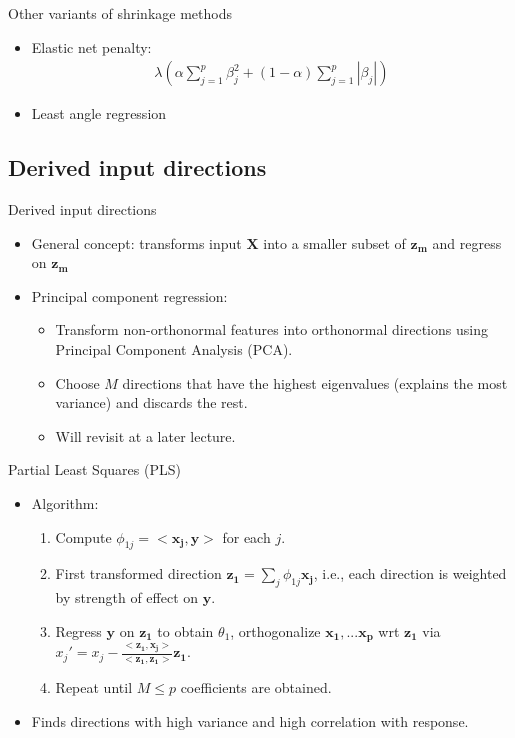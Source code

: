 \documentclass[aspectratio=169]{beamer}
\let \vec \mathbf
\begin{document}
\begin{frame}{Other variants of shrinkage methods}
    \begin{itemize}
        \item Elastic net penalty:
        \begin{eqnarray*}
            \lambda \left( \alpha \sum_{j=1}^p \beta_j^2+ (1-\alpha) \sum_{j=1}^p |\beta_j| \right)
        \end{eqnarray*}
        \item Least angle regression
    \end{itemize}
\end{frame}


\subsection{Derived input directions}

\begin{frame}{Derived input directions}
    \begin{itemize}
        \item General concept: transforms input $\vec{X}$ into a smaller subset of $\vec{z_m}$ and regress on $\vec{z_m}$
        \item Principal component regression:
        \begin{itemize}
            \item Transform non-orthonormal features into orthonormal directions using Principal Component Analysis (PCA).
            \item Choose $M$ directions that have the highest eigenvalues (explains the most variance) and discards the rest.
            \item Will revisit at a later lecture.
        \end{itemize}
    \end{itemize}
\end{frame}


\begin{frame}{Partial Least Squares (PLS)}
    \begin{itemize}
        \item Algorithm:
        \begin{enumerate}
            \item Compute $\phi_{1j} = <\vec{x_j}, \vec{y}>$ for each $j$.
            \item First transformed direction $\vec{z_1} = \sum_j \phi_{1j} \vec{x_j}$, i.e., each direction is weighted by strength of effect on $\vec{y}$.
            \item Regress $\vec{y}$ on $\vec{z_1}$ to obtain $\theta_1$, orthogonalize $\vec{x_1}, ... \vec{x_p}$ wrt $\vec{z_1}$ via $x_j' = x_j - \frac{<\vec{z_1}, \vec{x_j}>}{<\vec{z_1}, \vec{z_1}>}\vec{z_1}$.
            \item Repeat until $M \leq p$ coefficients are obtained.
        \end{enumerate}
        \item Finds directions with high variance and high correlation with response.
    \end{itemize}
\end{frame}
\end{document}

